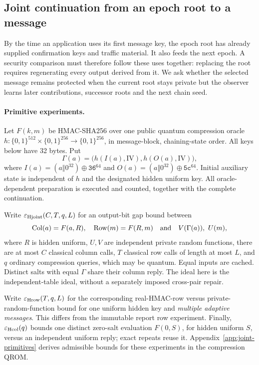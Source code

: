 \subsection{Joint continuation from an epoch root to a message}
\label{sec:joint-continuation}

By the time an application uses its first message key, the epoch root
has already supplied confirmation keys and traffic material. It also
feeds the next epoch. A security comparison must therefore follow these
uses together: replacing the root requires regenerating every output
derived from it. We ask whether the selected message remains protected
when the current root stays private but the observer learns later
contributions, successor roots and the next chain seed.

\paragraph{Primitive experiments.}
Let $F(k,m)$ be HMAC-SHA256 over one public quantum compression oracle
$h:\{0,1\}^{512}\times\{0,1\}^{256}\to\{0,1\}^{256}$, in message-block,
chaining-state order. All keys below have 32 bytes. Put
\[
 \Gamma(a)=\bigl(h(I(a),\mathrm{IV}),h(O(a),\mathrm{IV})\bigr),
\]
where $I(a)=(a\Vert0^{32})\oplus\mathtt{36}^{64}$ and
$O(a)=(a\Vert0^{32})\oplus\mathtt{5c}^{64}$.
Initial auxiliary state is independent of $h$ and the designated hidden
uniform key. All oracle-dependent preparation is executed and counted,
together with the complete continuation.

Write $\varepsilon_{\rm Hjoint}(C,T,q,L)$ for an output-bit gap bound between
\[
 \operatorname{Col}(a)=F(a,R),\quad
 \operatorname{Row}(m)=F(R,m)
 \quad\hbox{and}\quad
 V(\Gamma(a)),\ U(m),
\]
where $R$ is hidden uniform, $U,V$ are independent private random functions,
there are at most $C$ classical column calls, $T$ classical row calls of
length at most $L$, and $q$ ordinary compression queries, which may be
quantum. Equal inputs are cached. Distinct salts with equal $\Gamma$ share
their column reply. The ideal here is the independent-table ideal, without
a separately imposed cross-pair repair.

Write $\varepsilon_{\rm Hrow}(T,q,L)$ for the corresponding real-HMAC-row
versus private-random-function bound for one uniform hidden key and
\emph{multiple adaptive messages}. This differs from the immutable report
row experiment. Finally, $\varepsilon_{\rm Hcol}(q)$ bounds one distinct
zero-salt evaluation $F(0,S)$, for hidden uniform $S$, versus an independent
uniform reply; exact repeats reuse it. Appendix~\ref{app:joint-primitives}
derives admissible bounds for these experiments in the compression QROM.

